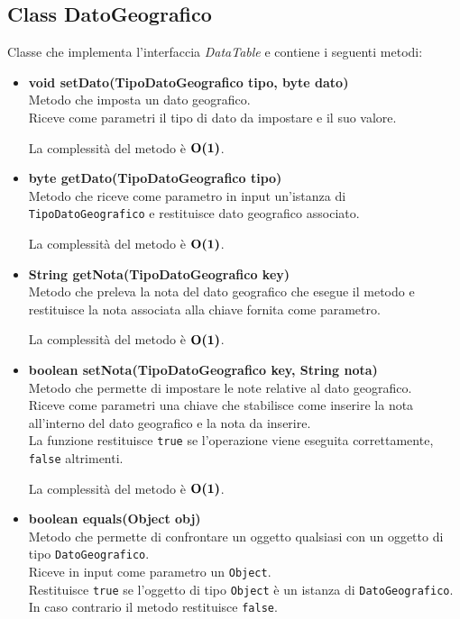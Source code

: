 \documentclass[a4paper, 12pt]{scrreprt}
\begin{document}
			\subsection{Class DatoGeografico}
			Classe che implementa l'interfaccia \textsl{DataTable} e contiene i seguenti metodi:
			\begin{itemize}
				\item \textbf{void setDato(TipoDatoGeografico tipo, byte dato)}
				\\Metodo che imposta un dato geografico.
				\\Riceve come parametri il tipo di dato da impostare e il suo valore.

				La complessit\`a del metodo \`e $\mathbf{O}\textbf{(1)}$.

				\item \textbf{byte getDato(TipoDatoGeografico tipo)}
				\\Metodo che riceve come parametro in input un'istanza di \verb!TipoDatoGeografico! e restituisce dato geografico associato.

				La complessit\`a del metodo \`e $\mathbf{O}\textbf{(1)}$.

				\item \textbf{String getNota(TipoDatoGeografico key)}
				\\Metodo che preleva la nota del dato geografico che esegue il metodo e restituisce la nota associata alla chiave fornita come parametro.

				La complessit\`a del metodo \`e $\mathbf{O}\textbf{(1)}$.

				\item \textbf{boolean setNota(TipoDatoGeografico key, String nota)}
				\\Metodo che permette di impostare le note relative al dato geografico.
				\\Riceve come parametri una chiave che stabilisce come inserire la nota all'interno del dato geografico e la nota da inserire.
				\\La funzione restituisce \verb!true! se l'operazione viene eseguita correttamente, \verb!false! altrimenti.

				La complessit\`a del metodo \`e $\mathbf{O}\textbf{(1)}$.

				\item \textbf{boolean equals(Object obj)}
				\\Metodo che permette di confrontare un oggetto qualsiasi con un oggetto di tipo \verb!DatoGeografico!.
				\\Riceve in input come parametro un \verb!Object!.
				\\Restituisce \verb!true! se l'oggetto di tipo \verb!Object! \`e un istanza di \verb!DatoGeografico!.
				\\In caso contrario il metodo restituisce \verb!false!.


\end{itemize}
\end{document}
